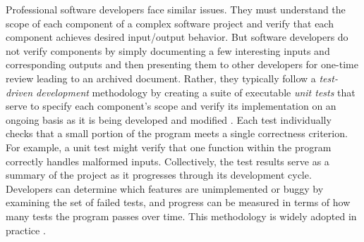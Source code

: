 \documentclass{frontiersSCNS}
\begin{document}





Professional software developers face similar issues\citep{omar_sciunit_2013}. 
They must understand the scope of each component of a complex software project and verify that each component achieves desired input/output behavior. 
But software developers do not verify components by simply documenting a few interesting inputs and corresponding outputs and then presenting them to other developers for one-time review leading to an archived document. 
Rather, they typically follow a \emph{test-driven development} methodology by creating a suite of executable \emph{unit tests} that serve to specify each component's scope and verify its implementation on an ongoing basis as it is being developed and modified \citep{beck2003}. 
Each test individually checks that a small portion of the program meets a single correctness criterion. For example, a unit test might verify that one function within the program correctly handles malformed inputs. 
Collectively, the test results serve as a summary of the project as it progresses through its development cycle. 
Developers can determine which features are unimplemented or buggy by examining the set of failed tests, and progress can be measured in terms of how many tests the program passes over time. 
This methodology is widely adopted in practice \citep{beck2003}.
\end{document}
